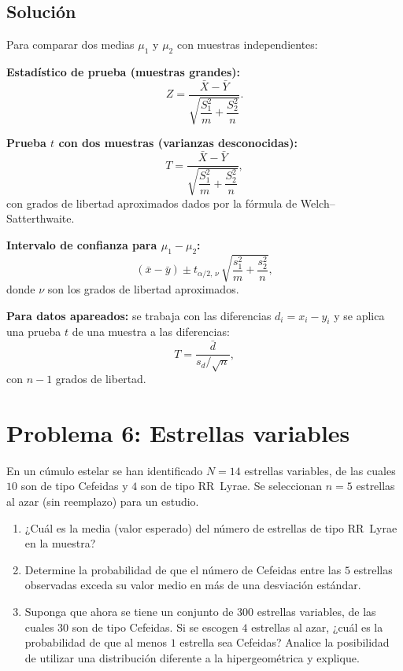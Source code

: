 \documentclass[12pt]{article}
\begin{document}
\subsection{Solución}

Para comparar dos medias $\mu_1$ y $\mu_2$ con muestras independientes:

\textbf{Estadístico de prueba (muestras grandes):}
$$Z = \frac{\bar{X} - \bar{Y}}{\sqrt{\dfrac{S_1^2}{m} + \dfrac{S_2^2}{n}}}.$$

\textbf{Prueba $t$ con dos muestras (varianzas desconocidas):}
$$T = \frac{\bar{X} - \bar{Y}}{\sqrt{\dfrac{S_1^2}{m} + \dfrac{S_2^2}{n}}},$$
con grados de libertad aproximados dados por la fórmula de Welch--Satterthwaite.

\textbf{Intervalo de confianza para $\mu_1 - \mu_2$:}
$$(\bar{x} - \bar{y}) \pm t_{\alpha/2,\,\nu}\,\sqrt{\frac{s_1^2}{m} + \frac{s_2^2}{n}},$$
donde $\nu$ son los grados de libertad aproximados.

\textbf{Para datos apareados:} se trabaja con las diferencias $d_i = x_i - y_i$ y se aplica una prueba $t$ de una muestra a las diferencias:
$$T = \frac{\bar{d}}{s_d / \sqrt{n}},$$
con $n-1$ grados de libertad.

\section{Problema 6: Estrellas variables}

En un cúmulo estelar se han identificado $N=14$ estrellas variables, de las cuales $10$ son de tipo Cefeidas y $4$ son de tipo RR~Lyrae. Se seleccionan $n=5$ estrellas al azar (sin reemplazo) para un estudio.

\begin{enumerate}[label=\alph*)]
    \item ¿Cuál es la media (valor esperado) del número de estrellas de tipo RR~Lyrae en la muestra?
    \item Determine la probabilidad de que el número de Cefeidas entre las $5$ estrellas observadas exceda su valor medio en más de una desviación estándar.
    \item Suponga que ahora se tiene un conjunto de $300$ estrellas variables, de las cuales $30$ son de tipo Cefeidas. Si se escogen $4$ estrellas al azar, ¿cuál es la probabilidad de que al menos $1$ estrella sea Cefeidas? Analice la posibilidad de utilizar una distribución diferente a la hipergeométrica y explique.
\end{enumerate}
\end{document}
